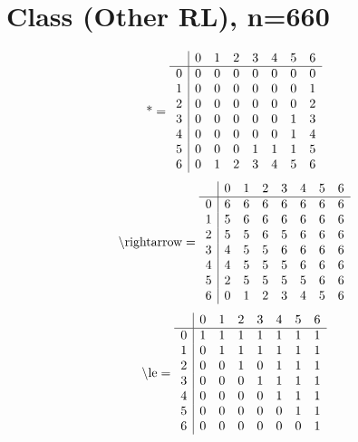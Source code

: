 \documentclass[11pt]{article}
\begin{document}
\section{Class (Other RL), n=660}
\[\text{*} = 
\begin{array}{r | r r r r r r r}
 & 0 & 1 & 2 & 3 & 4 & 5 & 6 \\ \hline
0 & 0 & 0 & 0 & 0 & 0 & 0 & 0 \\
1 & 0 & 0 & 0 & 0 & 0 & 0 & 1 \\
2 & 0 & 0 & 0 & 0 & 0 & 0 & 2 \\
3 & 0 & 0 & 0 & 0 & 0 & 1 & 3 \\
4 & 0 & 0 & 0 & 0 & 0 & 1 & 4 \\
5 & 0 & 0 & 0 & 1 & 1 & 1 & 5 \\
6 & 0 & 1 & 2 & 3 & 4 & 5 & 6 \\
\end{array}
\]
\[\text{\textbackslash rightarrow} = 
\begin{array}{r | r r r r r r r}
 & 0 & 1 & 2 & 3 & 4 & 5 & 6 \\ \hline
0 & 6 & 6 & 6 & 6 & 6 & 6 & 6 \\
1 & 5 & 6 & 6 & 6 & 6 & 6 & 6 \\
2 & 5 & 5 & 6 & 5 & 6 & 6 & 6 \\
3 & 4 & 5 & 5 & 6 & 6 & 6 & 6 \\
4 & 4 & 5 & 5 & 5 & 6 & 6 & 6 \\
5 & 2 & 5 & 5 & 5 & 5 & 6 & 6 \\
6 & 0 & 1 & 2 & 3 & 4 & 5 & 6 \\
\end{array}
\]
\[\text{\textbackslash le} = 
\begin{array}{r | r r r r r r r}
 & 0 & 1 & 2 & 3 & 4 & 5 & 6 \\ \hline
0 & 1 & 1 & 1 & 1 & 1 & 1 & 1 \\
1 & 0 & 1 & 1 & 1 & 1 & 1 & 1 \\
2 & 0 & 0 & 1 & 0 & 1 & 1 & 1 \\
3 & 0 & 0 & 0 & 1 & 1 & 1 & 1 \\
4 & 0 & 0 & 0 & 0 & 1 & 1 & 1 \\
5 & 0 & 0 & 0 & 0 & 0 & 1 & 1 \\
6 & 0 & 0 & 0 & 0 & 0 & 0 & 1 \\
\end{array}
\]
\end{document}
